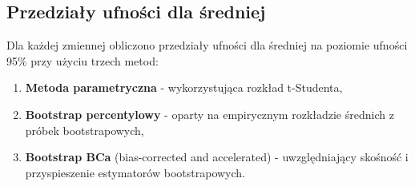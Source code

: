 \documentclass[12pt,a4paper]{article}
\begin{document}
\subsection{Przedziały ufności dla średniej}

Dla każdej zmiennej obliczono przedziały ufności dla średniej na poziomie ufności 95\% przy użyciu trzech metod:

\begin{enumerate}
    \item \textbf{Metoda parametryczna} - wykorzystująca rozkład t-Studenta,
    \item \textbf{Bootstrap percentylowy} - oparty na empirycznym rozkładzie średnich z próbek bootstrapowych,
    \item \textbf{Bootstrap BCa} (bias-corrected and accelerated) - uwzględniający skośność i przyspieszenie estymatorów bootstrapowych.
\end{enumerate}
\end{document}
